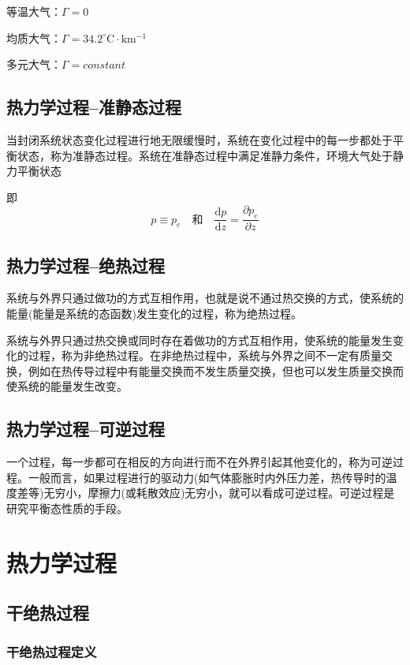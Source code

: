 \documentclass[UTF8,a4paper,11pt,oneside]{ctexbook}
\begin{document}
等温大气：\(\Gamma=0\)

均质大气：\(\Gamma=34.2^\circ\mathrm{C\cdot{}km^{-1}}\)

多元大气：\(\Gamma=constant\)

\section{热力学过程--准静态过程}

当封闭系统状态变化过程进行地无限缓慢时，系统在变化过程中的每一步都处于平衡状态，称为准静态过程。系统在准静态过程中满足准静力条件，环境大气处于静力平衡状态

即
\begin{equation}
p\equiv{}p_e\quad\text{和}\quad\dfrac{\mathrm{d}p}{\mathrm{d}z}=\dfrac{\partial{}p_e}{\partial{}z}
\end{equation}

\section{热力学过程--绝热过程}

系统与外界只通过做功的方式互相作用，也就是说不通过热交换的方式，使系统的能量(能量是系统的态函数)发生变化的过程，称为绝热过程。

系统与外界只通过热交换或同时存在着做功的方式互相作用，使系统的能量发生变化的过程，称为非绝热过程。在非绝热过程中，系统与外界之间不一定有质量交换，例如在热传导过程中有能量交换而不发生质量交换，但也可以发生质量交换而使系统的能量发生改变。

\section{热力学过程--可逆过程}
一个过程，每一步都可在相反的方向进行而不在外界引起其他变化的，称为可逆过程。一般而言，如果过程进行的驱动力(如气体膨胀时内外压力差，热传导时的温度差等)无穷小，摩擦力(或耗散效应)无穷小，就可以看成可逆过程。可逆过程是研究平衡态性质的手段。

\chapter{热力学过程}

\section{干绝热过程}

\subsection{干绝热过程定义}
\end{document}
